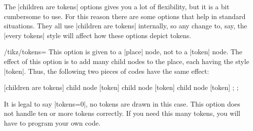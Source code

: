 The |children are tokens| options gives you a lot of flexibility, but
it is a bit cumbersome to use. For this reason there are some options
that help in standard situations. They all use |children are tokens|
internally, so any change to, say, the |every tokens| style will
affect how these options depict tokens.

\begin{key}{/tikz/tokens=}
  This option is given to a |place| node, not to a |token| node. The
  effect of this option is to add  many child nodes to
  the place, each having the style |token|. Thus, the following two
  pieces of codes have the same effect:
\begin{codeexample}[]
\tikz
  \node[place] {}
  [children are tokens]
  child {node [token] {}}
  child {node [token] {}}
  child {node [token] {}};
\tikz
  \node[place,tokens=3] {};
\end{codeexample}
  It is legal to say |tokens=0|, no tokens are drawn in this
  case. This option does not handle ten or more tokens correctly. If
  you need this many tokens, you will have to program your own code.
\begin{codeexample}[]
\end{codeexample}
\end{key}

